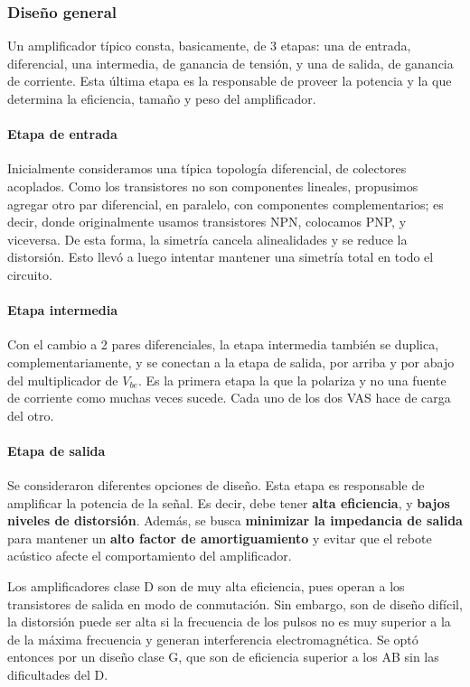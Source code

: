 \documentclass[a4paper,12pt,twoside]{article}
\begin{document}
\subsubsection{Diseño general}

Un amplificador típico consta, basicamente, de 3 etapas: una de entrada, diferencial,  una intermedia, de ganancia de tensión, y una de salida, de ganancia de corriente. Esta última etapa es la responsable de proveer la potencia y la que determina la eficiencia, tamaño y peso del amplificador. 


\paragraph{Etapa de entrada}
Inicialmente consideramos una típica topología diferencial, de colectores acoplados. Como los transistores no son componentes lineales, propusimos agregar otro par diferencial, en paralelo, con componentes complementarios; es decir, donde originalmente usamos transistores NPN, colocamos PNP, y viceversa. De esta forma, la simetría cancela alinealidades y se reduce la distorsión. Esto llevó a luego intentar mantener una simetría total en todo el circuito.

\paragraph{Etapa intermedia}

Con el cambio a 2 pares diferenciales, la etapa intermedia también se duplica, complementariamente, y se conectan a la etapa de salida, por arriba y por abajo del multiplicador de $V_{be}$. Es la primera etapa la que la polariza y no una fuente de corriente como muchas veces sucede. Cada uno de los dos VAS hace de carga del otro.

\paragraph{Etapa de salida}
Se consideraron diferentes opciones de diseño. Esta etapa es responsable de amplificar la potencia de la señal. Es decir, debe tener \textbf{alta eficiencia}, y \textbf{bajos niveles de distorsión}. Además, se busca \textbf{minimizar la impedancia de salida} para mantener un \textbf{alto factor de amortiguamiento} y evitar que el rebote acústico afecte el comportamiento del amplificador. 

Los amplificadores clase D son de muy alta eficiencia, pues operan a los transistores de salida en modo de conmutación. Sin embargo, son de diseño difícil, la distorsión puede ser alta si la frecuencia de los pulsos no es muy superior a la de la máxima frecuencia y generan interferencia electromagnética. Se optó entonces por un diseño clase G, que son de eficiencia superior a los AB sin las dificultades del D. 
\end{document}
